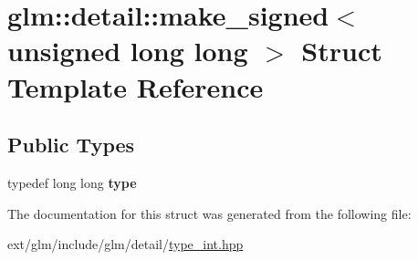 \hypertarget{structglm_1_1detail_1_1make__signed_3_01unsigned_01long_01long_01_4}{\section{glm\-:\-:detail\-:\-:make\-\_\-signed$<$ unsigned long long $>$ Struct Template Reference}
\label{structglm_1_1detail_1_1make__signed_3_01unsigned_01long_01long_01_4}
}
\subsection*{Public Types}
\begin{DoxyCompactItemize}
\item 
\hypertarget{structglm_1_1detail_1_1make__signed_3_01unsigned_01long_01long_01_4_a025f1f9880bc973147ffb0371771eb0b}{typedef long long {\bfseries type}}\label{structglm_1_1detail_1_1make__signed_3_01unsigned_01long_01long_01_4_a025f1f9880bc973147ffb0371771eb0b}

\end{DoxyCompactItemize}


The documentation for this struct was generated from the following file\-:\begin{DoxyCompactItemize}
\item 
ext/glm/include/glm/detail/\hyperlink{type__int_8hpp}{type\-\_\-int.\-hpp}\end{DoxyCompactItemize}

